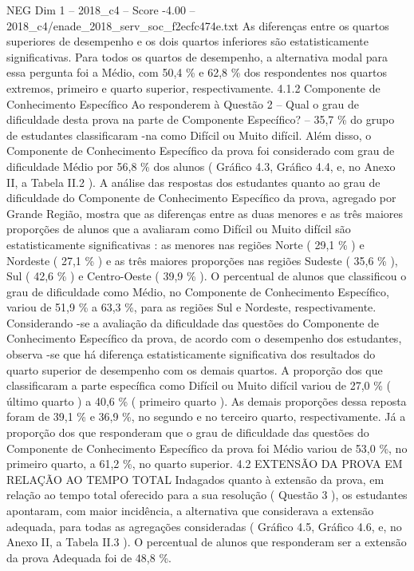 \begin{textsample}{NEG Dim 1 – 2018\_c4 – Score -4.00 – 2018\_c4/enade\_2018\_serv\_soc\_f2ecfc474e.txt}
As diferenças entre os quartos superiores de desempenho e os dois quartos inferiores são estatisticamente significativas.
Para todos os quartos de desempenho, a alternativa modal para essa pergunta foi a Médio, com 50,4 \% e 62,8 \% dos respondentes nos quartos extremos, primeiro e quarto superior, respectivamente. 4.1.2 Componente de Conhecimento Específico Ao responderem à Questão 2 – Qual o grau de dificuldade desta prova na parte de Componente Específico? – 35,7 \% do grupo de estudantes classificaram -na como Difícil ou Muito difícil.
Além disso, o Componente de Conhecimento Específico da prova foi considerado com grau de dificuldade Médio por 56,8 \% dos alunos ( Gráfico 4.3, Gráfico 4.4, e, no Anexo II, a Tabela II.2 ).
A análise das respostas dos estudantes quanto ao grau de dificuldade do Componente de Conhecimento Específico da prova, agregado por Grande Região, mostra que as diferenças entre as duas menores e as três maiores proporções de alunos que a avaliaram como Difícil ou Muito difícil são estatisticamente significativas : as menores nas regiões Norte ( 29,1 \% ) e Nordeste ( 27,1 \% ) e as três maiores proporções nas regiões Sudeste ( 35,6 \% ), Sul ( 42,6 \% ) e Centro-Oeste ( 39,9 \% ).
O percentual de alunos que classificou o grau de dificuldade como Médio, no Componente de Conhecimento Específico, variou de 51,9 \% a 63,3 \%, para as regiões Sul e Nordeste, respectivamente.
Considerando -se a avaliação da dificuldade das questões do Componente de Conhecimento Específico da prova, de acordo com o desempenho dos estudantes, observa -se que há diferença estatisticamente significativa dos resultados do quarto superior de desempenho com os demais quartos.
A proporção dos que classificaram a parte específica como Difícil ou Muito difícil variou de 27,0 \% ( último quarto ) a 40,6 \% ( primeiro quarto ).
As demais proporções dessa reposta foram de 39,1 \% e 36,9 \%, no segundo e no terceiro quarto, respectivamente.
Já a proporção dos que responderam que o grau de dificuldade das questões do Componente de Conhecimento Específico da prova foi Médio variou de 53,0 \%, no primeiro quarto, a 61,2 \%, no quarto superior. 4.2 EXTENSÃO DA PROVA EM RELAÇÃO AO TEMPO TOTAL Indagados quanto à extensão da prova, em relação ao tempo total oferecido para a sua resolução ( Questão 3 ), os estudantes apontaram, com maior incidência, a alternativa que considerava a extensão adequada, para todas as agregações consideradas ( Gráfico 4.5, Gráfico 4.6, e, no Anexo II, a Tabela II.3 ).
O percentual de alunos que responderam ser a extensão da prova Adequada foi de 48,8 \%.

\end{textsample}
